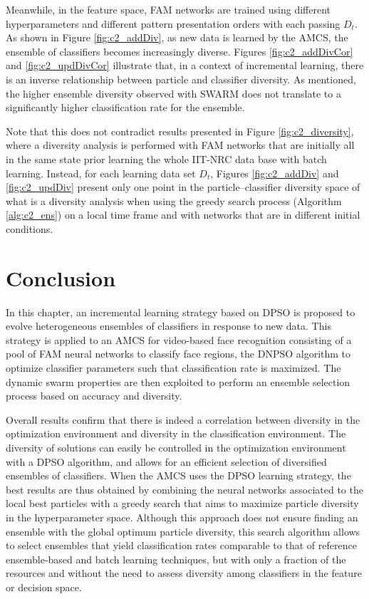 Meanwhile, in the feature space, FAM networks are trained using different hyperparameters and different pattern presentation orders with each passing $D_t$.
As shown in Figure \ref{fig:c2_addDiv}, as new data is learned by the AMCS, the ensemble of classifiers becomes increasingly diverse.
Figures \ref{fig:c2_addDivCor} and \ref{fig:c2_updDivCor} illustrate that, in a context of incremental learning, there is an inverse relationship between particle and classifier diversity.
As mentioned, the higher ensemble diversity observed with SWARM does not translate to a significantly higher classification rate for the ensemble.

Note that this does not contradict results presented in Figure \ref{fig:c2_diversity}, where a diversity analysis is performed with FAM networks that are initially all in the same state prior learning the whole IIT-NRC data base with batch learning.
Instead, for each learning data set $D_t$, Figures \ref{fig:c2_addDiv} and \ref{fig:c2_updDiv} present only one point in the particle--classifier diversity space of what is a diversity analysis when using the greedy search process (Algorithm \ref{alg:c2_ens}) on a local time frame and with networks that are in different initial conditions.

\section{Conclusion} \label{sec:c2_conclusion}

In this chapter, an incremental learning strategy based on DPSO is proposed to evolve heterogeneous ensembles of classifiers in response to new data.
This strategy is applied to an AMCS for video-based face recognition consisting of a pool of FAM neural networks to classify face regions, the DNPSO algorithm to optimize classifier parameters such that classification rate is maximized.
The dynamic swarm properties are then exploited to perform an ensemble selection process based on accuracy and diversity.

Overall results confirm that there is indeed a correlation between diversity in the optimization environment and diversity in the classification environment.
The diversity of solutions can easily be controlled in the optimization environment with a DPSO algorithm, and allows for an efficient selection of diversified ensembles of classifiers.
When the AMCS uses the DPSO learning strategy, the best results are thus obtained by combining the neural networks associated to the local best particles with a greedy search that aims to maximize particle diversity in the hyperparameter space.
Although this approach does not ensure finding an ensemble with the global optimum particle diversity, this search algorithm allows to select ensembles that yield classification rates comparable to that of reference ensemble-based and batch learning techniques, but with only a fraction of the resources and without the need to assess diversity among classifiers in the feature or decision space.

